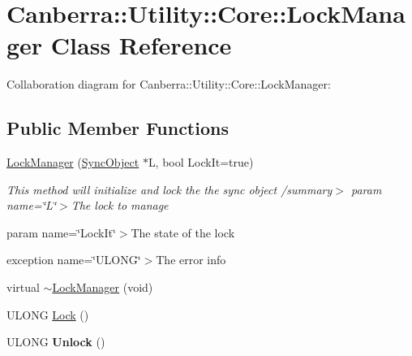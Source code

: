 \hypertarget{class_canberra_1_1_utility_1_1_core_1_1_lock_manager}{}\section{Canberra\+:\+:Utility\+:\+:Core\+:\+:Lock\+Manager Class Reference}
\label{class_canberra_1_1_utility_1_1_core_1_1_lock_manager}


Collaboration diagram for Canberra\+:\+:Utility\+:\+:Core\+:\+:Lock\+Manager\+:
\subsection*{Public Member Functions}
\begin{DoxyCompactItemize}
\item 
\mbox{\label{class_canberra_1_1_utility_1_1_core_1_1_lock_manager_ab9e3a578521f78e25f576207d28254bb}} 
\hyperlink{class_canberra_1_1_utility_1_1_core_1_1_lock_manager_ab9e3a578521f78e25f576207d28254bb}{Lock\+Manager} (\hyperlink{class_canberra_1_1_utility_1_1_core_1_1_sync_object}{Sync\+Object} $\ast$L, bool Lock\+It=true)
\begin{DoxyCompactList}\small\item\em This method will initialize and lock the the sync object /summary$>$ param name=\char`\"{}\+L\char`\"{}$>$The lock to manage

param name=\char`\"{}\+Lock\+It\char`\"{}$>$The state of the lock

exception name=\char`\"{}\+U\+L\+O\+N\+G\char`\"{}$>$The error info\end{DoxyCompactList}\item 
virtual \hyperlink{class_canberra_1_1_utility_1_1_core_1_1_lock_manager_abd2f0fbc6748df132a6e347207702a8e_abd2f0fbc6748df132a6e347207702a8e}{$\sim$\+Lock\+Manager} (void)
\item 
U\+L\+O\+NG \hyperlink{class_canberra_1_1_utility_1_1_core_1_1_lock_manager_aa3843447f5eac5a89d2132966db671b5_aa3843447f5eac5a89d2132966db671b5}{Lock} ()
\item 
\mbox{\label{class_canberra_1_1_utility_1_1_core_1_1_lock_manager_acbc3677d361d9c3804a8f2053bb6f7aa}} 
U\+L\+O\+NG {\bfseries Unlock} ()
\end{DoxyCompactItemize}
